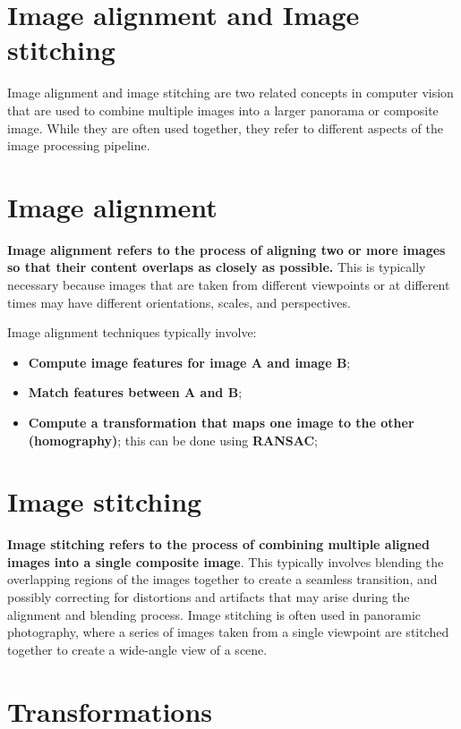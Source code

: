 \documentclass{article}
\begin{document}
\newpage

\section*{Image alignment and Image stitching}

Image alignment and image stitching are two related concepts in computer vision that are used to combine multiple images into a larger panorama or composite image. While they are often used together, they refer to different aspects of the image processing pipeline.

\section*{Image alignment}

\textbf{Image alignment refers to the process of aligning two or more images so that their content overlaps as closely as possible.} This is typically necessary because images that are taken from different viewpoints or at different times may have different orientations, scales, and perspectives.

Image alignment techniques typically involve:
\begin{itemize}
    \item \textbf{Compute image features for image A and image B};
    \item \textbf{Match features between A and B};
    \item \textbf{Compute a transformation that maps one image to the other (homography)}; this can be done using \textbf{RANSAC};
\end{itemize}

\section*{Image stitching}

\textbf{Image stitching refers to the process of combining multiple aligned images into a single composite image}. This typically involves blending the overlapping regions of the images together to create a seamless transition, and possibly correcting for distortions and artifacts that may arise during the alignment and blending process. Image stitching is often used in panoramic photography, where a series of images taken from a single viewpoint are stitched together to create a wide-angle view of a scene.

\newpage

\section*{Transformations}
\end{document}
